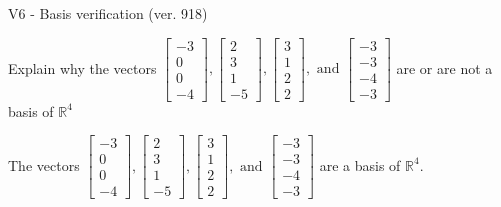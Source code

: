 \begin{exercise}
  \begin{exerciseTitle}V6 - Basis verification (ver. 918)\end{exerciseTitle}
  \begin{exerciseStatement}
    Explain why the vectors \(\left[\begin{array}{r}
-3 \\
0 \\
0 \\
-4
\end{array}\right] , \left[\begin{array}{r}
2 \\
3 \\
1 \\
-5
\end{array}\right] , \left[\begin{array}{r}
3 \\
1 \\
2 \\
2
\end{array}\right] , \text{ and } \left[\begin{array}{r}
-3 \\
-3 \\
-4 \\
-3
\end{array}\right]\) are or are not a basis of \(\mathbb{R}^4\)	


  \end{exerciseStatement}
  \begin{exerciseAnswer}
   The vectors \(\left[\begin{array}{r}
-3 \\
0 \\
0 \\
-4
\end{array}\right] , \left[\begin{array}{r}
2 \\
3 \\
1 \\
-5
\end{array}\right] , \left[\begin{array}{r}
3 \\
1 \\
2 \\
2
\end{array}\right] , \text{ and } \left[\begin{array}{r}
-3 \\
-3 \\
-4 \\
-3
\end{array}\right]\) 
  	 are  a basis of \(\mathbb{R}^4\).
  


  \end{exerciseAnswer}
\end{exercise}